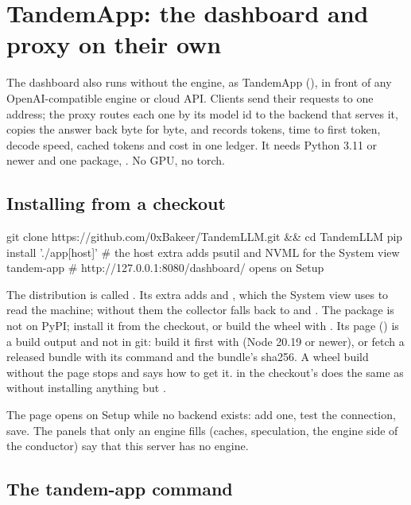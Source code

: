 \chapter{TandemApp: the dashboard and proxy on their own}\label{ch:install-app}

The dashboard also runs without the engine, as TandemApp (), in front of any OpenAI-compatible engine or cloud API. Clients send their requests to one address; the proxy routes each one by its model id to the backend that serves it, copies the answer back byte for byte, and records tokens, time to first token, decode speed, cached tokens and cost in one ledger. It needs Python 3.11 or newer and one package, . No GPU, no torch.

\section{Installing from a checkout}

\begin{shell}
git clone https://github.com/0xBakeer/TandemLLM.git && cd TandemLLM
pip install './app[host]'  # the host extra adds psutil and NVML for the System view
tandem-app                 # http://127.0.0.1:8080/dashboard/ opens on Setup
\end{shell}

The distribution is called . Its  extra adds  and , which the System view uses to read the machine; without them the collector falls back to  and . The package is not on PyPI; install it from the checkout, or build the wheel with . Its page () is a build output and not in git: build it first with  (Node 20.19 or newer), or fetch a released bundle with its  command and the bundle's sha256. A wheel build without the page stops and says how to get it.  in the checkout's  does the same as  without installing anything but .

The page opens on Setup while no backend exists: add one, test the connection, save. The panels that only an engine fills (caches, speculation, the engine side of the conductor) say that this server has no engine.

\section{The tandem-app command}

